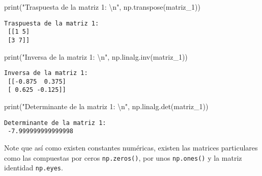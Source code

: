 \documentclass[
  letterpaper,
  DIV=11,
  numbers=noendperiod]{scrreprt}
\newenvironment{Shaded}{\begin{snugshade}}{\end{snugshade}}
\newcommand{\BuiltInTok}[1]{\textcolor[rgb]{0.00,0.23,0.31}{#1}}
\newcommand{\CharTok}[1]{\textcolor[rgb]{0.13,0.47,0.30}{#1}}
\newcommand{\NormalTok}[1]{\textcolor[rgb]{0.00,0.23,0.31}{#1}}
\newcommand{\StringTok}[1]{\textcolor[rgb]{0.13,0.47,0.30}{#1}}
\begin{document}
\begin{Shaded}
\begin{Highlighting}[]
\BuiltInTok{print}\NormalTok{(}\StringTok{"Traspuesta de la matriz 1: }\CharTok{\textbackslash{}n}\StringTok{"}\NormalTok{, np.transpose(matriz\_1))}
\end{Highlighting}
\end{Shaded}

\begin{verbatim}
Traspuesta de la matriz 1: 
 [[1 5]
 [3 7]]
\end{verbatim}

\begin{Shaded}
\begin{Highlighting}[]
\BuiltInTok{print}\NormalTok{(}\StringTok{"Inversa de la matriz 1: }\CharTok{\textbackslash{}n}\StringTok{"}\NormalTok{, np.linalg.inv(matriz\_1))}
\end{Highlighting}
\end{Shaded}

\begin{verbatim}
Inversa de la matriz 1: 
 [[-0.875  0.375]
 [ 0.625 -0.125]]
\end{verbatim}

\begin{Shaded}
\begin{Highlighting}[]
\BuiltInTok{print}\NormalTok{(}\StringTok{"Determinante de la matriz 1: }\CharTok{\textbackslash{}n}\StringTok{"}\NormalTok{, np.linalg.det(matriz\_1))}
\end{Highlighting}
\end{Shaded}

\begin{verbatim}
Determinante de la matriz 1: 
 -7.999999999999998
\end{verbatim}

\begin{tcolorbox}[enhanced jigsaw, colframe=quarto-callout-note-color-frame, leftrule=.75mm, titlerule=0mm, left=2mm, bottomtitle=1mm, arc=.35mm, opacitybacktitle=0.6, toptitle=1mm, colbacktitle=quarto-callout-note-color!10!white, opacityback=0, breakable, title=\textcolor{quarto-callout-note-color}{\faInfo}\hspace{0.5em}{Note}, toprule=.15mm, rightrule=.15mm, colback=white, coltitle=black, bottomrule=.15mm]

Note que así como existen constantes numéricas, existen las matrices
particulares como las compuestas por ceros \texttt{np.zeros()}, por unos
\texttt{np.ones()} y la matriz identidad \texttt{np.eyes}.

\end{tcolorbox}
\end{document}
